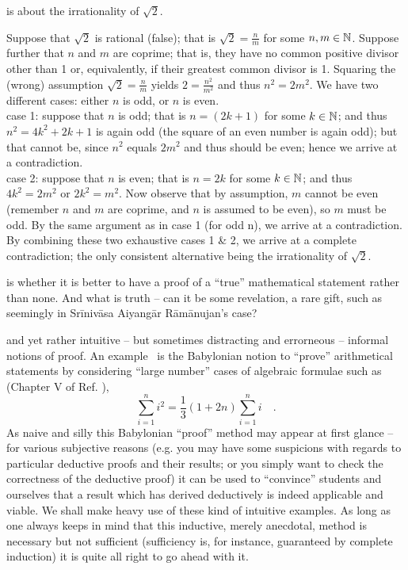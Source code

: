  is about the irrationality of $\sqrt{2}$.

{\color{OliveGreen}
\bproof
Suppose that $\sqrt{2}$ is rational (false); that is
$\sqrt{2} = \frac{n}{m}$ for some $n, m \in {\Bbb N}$.
Suppose further that $n$ and $m$ are coprime;
that is, they have no common positive divisor other than 1 or, equivalently, if their greatest common divisor is 1.
Squaring the  (wrong) assumption $\sqrt{2} = \frac{n}{m}$ yields $2= \frac{n^2}{m^2}$ and thus $n^2 =2m^2$.
We have two different cases: either $n$ is odd, or $n$ is even.
 \\
case 1: suppose that $n$ is odd; that is $n=(2k+1)$ for some $k\in {\Bbb N}$; and thus
$n^2 = 4k^2+2k+1$ is again odd (the square of an even number is again odd); but that cannot be,
since $n^2$ equals $2m^2$ and thus should be even; hence we arrive at a contradiction.
\\
case 2:  suppose that $n$ is even;  that is $n=2k$ for some $k\in {\Bbb N}$; and thus
$4k^2 = 2m^2$ or $2k^2 = m^2$.
Now observe that by assumption, $m$ cannot be even (remember  $n$ and $m$ are coprime, and
$n$ is assumed to be even), so $m$ must be odd. By the same argument as in case 1 (for odd n),
we arrive at a contradiction.
By combining these two exhaustive cases 1 \& 2, we arrive at a complete contradiction;
the only consistent alternative being the irrationality of $\sqrt{2}$.
\eproof
}


 is whether it is better to have a proof of a ``true'' mathematical statement rather than none.
And what is truth -- can it be some revelation, a rare gift, such as seemingly in Sr\={i}niv\={a}sa Aiyang\={a}r
R\={a}m\={a}nujan's case?


 and yet rather intuitive -- but sometimes distracting and errorneous -- informal notions of proof.
An example~\cite{baats1} is the Babylonian notion to ``prove'' arithmetical statements
by considering ``large number'' cases
of algebraic formulae such as  (Chapter V of Ref. \cite{neugeb}),
$$\sum_{i=1}^n i^2 = \frac{1}{3}\left(1+2n\right)\sum_{i=1}^n i \quad .$$
As naive and silly this Babylonian ``proof'' method may appear at first glance  -- for various subjective reasons
(e.g. you may have some suspicions with regards to particular deductive proofs and their results; or you simply want to check the correctness of the deductive proof)
it can be used to ``convince'' students and ourselves that
a result which has derived deductively is indeed applicable and viable.
We shall make heavy use of these kind of intuitive examples.
As long as one always keeps in mind that this inductive, merely anecdotal, method is necessary but not sufficient
(sufficiency is, for instance, guaranteed by complete induction) it is quite all right to go ahead with it.


